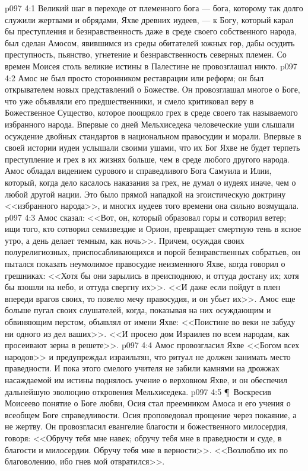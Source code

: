 \vs p097 4:1 Великий шаг в переходе от племенного бога --- бога, которому так долго служили жертвами и обрядами, Яхве древних иудеев, --- к Богу, который карал бы преступления и безнравственность даже в среде своего собственного народа, был сделан Амосом, явившимся из среды обитателей южных гор, дабы осудить преступность, пьянство, угнетение и безнравственность северных племен. Со времен Моисея столь великие истины в Палестине не провозглашал никто.
\vs p097 4:2 Амос не был просто сторонником реставрации или реформ; он был открывателем новых представлений о Божестве. Он провозглашал многое о Боге, что уже объявляли его предшественники, и смело критиковал веру в Божественное Существо, которое поощряло грех в среде своего так называемого избранного народа. Впервые со дней Мельхиседека человеческие уши слышали осуждение двойных стандартов в национальном правосудии и морали. Впервые в своей истории иудеи услышали своими ушами, что их Бог Яхве не будет терпеть преступление и грех в их жизнях больше, чем в среде любого другого народа. Амос обладал видением сурового и справедливого Бога Самуила и Илии, который, когда дело касалось наказания за грех, не думал о иудеях иначе, чем о любой другой нации. Это было прямой нападкой на эгоистическую доктрину <<избранного народа>>, и многих иудеев того времени она сильно возмущала.
\vs p097 4:3 Амос сказал: <<Вот, он, который образовал горы и сотворил ветер; ищи того, кто сотворил семизвездие и Орион, превращает смертную тень в ясное утро, а день делает темным, как ночь>>. Причем, осуждая своих полурелигиозных, приспосабливающихся и порой безнравственных собратьев, он пытался показать неумолимое правосудие неизменного Яхве, когда говорил о грешниках: <<Хотя бы они зарылись в преисподнюю, и оттуда достану их; хотя бы взошли на небо, и оттуда свергну их>>. <<И даже если пойдут в плен впереди врагов своих, то повелю мечу правосудия, и он убьет их>>. Амос еще больше пугал своих слушателей, когда, показывая на них осуждающим и обвиняющим перстом, объявлял от имени Яхве: <<Поистине во веки не забуду ни одного из дел ваших>>. <<И просею дом Израилев по всем народам, как просеивают зерна в решете>>.
\vs p097 4:4 Амос провозгласил Яхве <<Богом всех народов>> и предупреждал израильтян, что ритуал не должен занимать место праведности. И пока этого смелого учителя не забили камнями на дрожжах насаждаемой им истины поднялось учение о верховном Яхве, и он обеспечил дальнейшую эволюцию откровения Мельхиседека.
\vs p097 4:5 \P\ Воскресив Моисеево понятие о Боге любви, Осия стал преемником Амоса и его учения о всеобщем Боге справедливости. Осия проповедовал прощение через покаяние, а не жертву. Он провозгласил евангелие благости и божественного милосердия, говоря: <<Обручу тебя мне навек; обручу тебя мне в праведности и суде, в благости и милосердии. Обручу тебя мне в верности>>. <<Возлюблю их по благоволению, ибо гнев мой отвратился>>.
